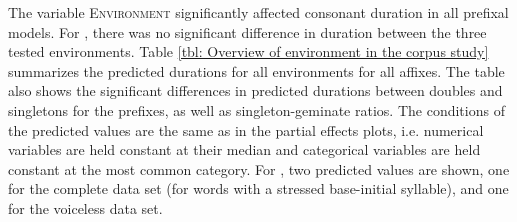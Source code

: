 The variable \textsc{Environment} significantly affected consonant duration in all prefixal models. For , there was no significant difference in duration between the three tested environments.
Table \ref{tbl: Overview of environment in the corpus study} summarizes the predicted durations for all environments for all affixes. The table also shows the significant differences in predicted durations between doubles and singletons for the prefixes, as well as singleton-geminate ratios.
The conditions of the predicted values are the same as in the partial effects plots, i.e. numerical variables are held constant at their median and categorical variables are held constant at the most common category. For , two predicted values are shown, one for the complete data set (for words with a stressed base-initial syllable), and one for the voiceless data set.







